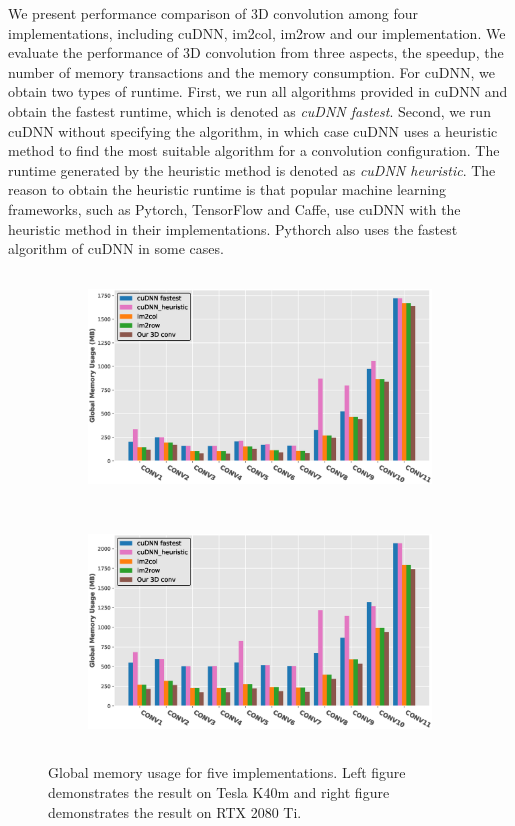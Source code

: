 \documentclass[sigplan,review,anonymous]{acmart}\settopmatter{printfolios=true,printccs=false,printacmref=false}
\begin{document}
We present performance comparison of 3D convolution among four implementations, including cuDNN, im2col, im2row and our implementation. We evaluate the performance of 3D convolution from three aspects, the speedup, the number of memory transactions and the memory consumption. For cuDNN, we obtain two types of runtime. First, we run all algorithms provided in cuDNN and obtain the fastest runtime, which is denoted as \emph{cuDNN fastest}. Second, we run cuDNN without specifying the algorithm, in which case cuDNN uses a heuristic method to find the most suitable algorithm for a convolution configuration. The runtime generated by the heuristic method is denoted as \emph{cuDNN heuristic}. The reason to obtain the heuristic runtime is that popular machine learning frameworks, such as Pytorch, TensorFlow and Caffe, use cuDNN with  the heuristic method in their implementations. Pythorch also uses the fastest algorithm of cuDNN in some cases.

\begin{figure}
	
	\begin{subfigure}{\columnwidth}
		\centering
		 \includegraphics[width=\columnwidth,height=6cm]{./figure/mem3d_1.eps}
		 \label{fig:3dmemk40m}
	\end{subfigure}
	\begin{subfigure}{\columnwidth}
		\centering
		 \includegraphics[width=\columnwidth,height=6cm]{./figure/mem3d_1_rtx2080.eps}
		 \label{fig:3dmemrtx2080}
	\end{subfigure}
	\caption{Global memory usage for five implementations. Left figure demonstrates the result on Tesla K40m and right figure demonstrates the result on RTX 2080 Ti.}
	\label{fig:3dmem}
\end{figure}
\end{document}
